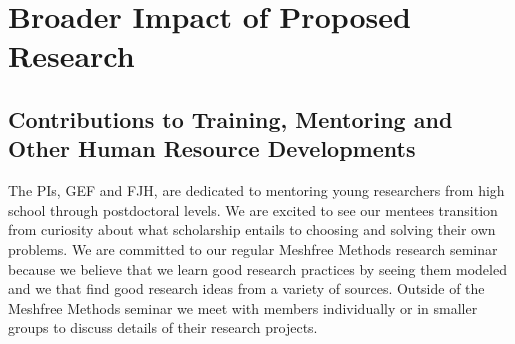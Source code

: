 \documentclass[11pt]{NSFamsart}
\begin{document}
\section{Broader Impact of Proposed Research}\label{SectBroad}


\subsection{Contributions to Training, Mentoring and Other Human Resource Developments}

The PIs, GEF and FJH, are dedicated to mentoring young researchers from high school through postdoctoral levels.  We are excited to see our mentees transition from curiosity about what scholarship entails to choosing and solving their own problems.  We are committed to our regular Meshfree Methods research seminar because we believe that we learn good research practices by seeing them modeled and we that find good research ideas from a variety of sources. Outside of the Meshfree Methods seminar we meet with members individually or in smaller groups to discuss details of their research projects.
\end{document}
